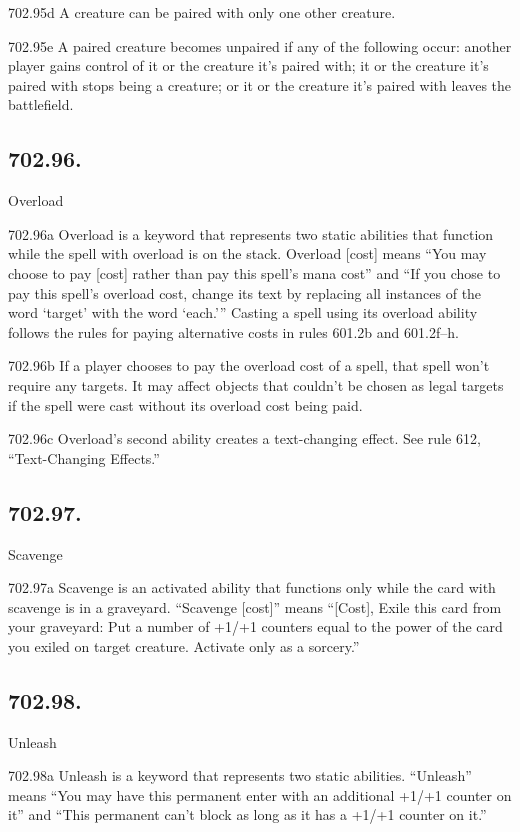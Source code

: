 702.95d A creature can be paired with only one other creature.

702.95e A paired creature becomes unpaired if any of the following occur: another player gains control of it or the creature it’s paired with; it or the creature it’s paired with stops being a creature; or it or the creature it’s paired with leaves the battlefield.

\subsection*{702.96.}
Overload

702.96a Overload is a keyword that represents two static abilities that function while the spell with overload is on the stack. Overload [cost] means “You may choose to pay [cost] rather than pay this spell’s mana cost” and “If you chose to pay this spell’s overload cost, change its text by replacing all instances of the word ‘target’ with the word ‘each.’” Casting a spell using its overload ability follows the rules for paying alternative costs in rules 601.2b and 601.2f–h.

702.96b If a player chooses to pay the overload cost of a spell, that spell won’t require any targets. It may affect objects that couldn’t be chosen as legal targets if the spell were cast without its overload cost being paid.

702.96c Overload’s second ability creates a text-changing effect. See rule 612, “Text-Changing Effects.”

\subsection*{702.97.}
Scavenge

702.97a Scavenge is an activated ability that functions only while the card with scavenge is in a graveyard. “Scavenge [cost]” means “[Cost], Exile this card from your graveyard: Put a number of +1/+1 counters equal to the power of the card you exiled on target creature. Activate only as a sorcery.”

\subsection*{702.98.}
Unleash

702.98a Unleash is a keyword that represents two static abilities. “Unleash” means “You may have this permanent enter with an additional +1/+1 counter on it” and “This permanent can’t block as long as it has a +1/+1 counter on it.”

